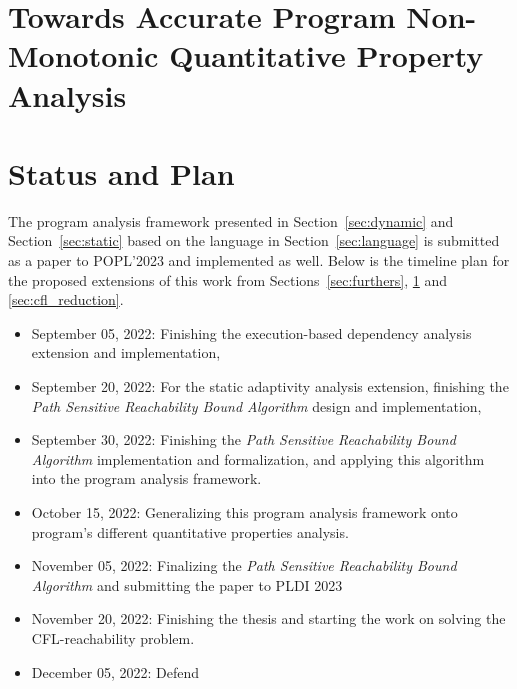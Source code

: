 \documentclass[a4paper,11pt]{article}
\begin{document}
\section{Towards Accurate Program Non-Monotonic Quantitative Property Analysis}
\label{sec:generalization}


% 

\section{Status and Plan}
The program analysis framework presented in Section~\ref{sec:dynamic} and Section~\ref{sec:static} 
based on the language in Section~\ref{sec:language}
 is submitted as a paper to POPL'2023 and implemented as well. 
 Below is the timeline plan for the proposed extensions of this work
 from Sections~\ref{sec:furthers}, \ref{sec:generalization} and \ref{sec:cfl_reduction}.
\begin{itemize}
\item September 05, 2022: Finishing the execution-based dependency analysis extension and implementation,
\item September 20, 2022: For the static adaptivity analysis extension, 
finishing the \emph{Path Sensitive Reachability Bound Algorithm} design and implementation, 
\item September 30, 2022: Finishing the \emph{Path Sensitive Reachability Bound Algorithm} implementation and formalization, 
and applying this algorithm into the program analysis framework.
\item October 15, 2022:  Generalizing this program analysis framework onto program's different quantitative properties analysis.
\item November 05, 2022: Finalizing the \emph{Path Sensitive Reachability Bound Algorithm} and submitting the paper to PLDI 2023
\item November 20, 2022: Finishing the thesis and starting the work on solving the CFL-reachability problem.
\item December 05, 2022: Defend
\end{itemize}




\end{document}
